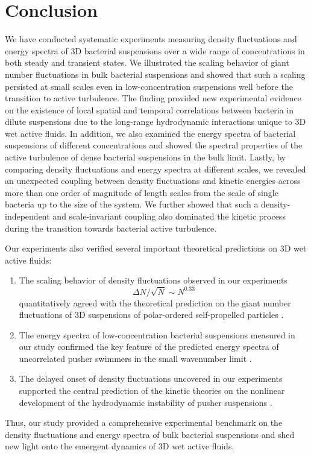 \section{Conclusion}
We have conducted systematic experiments measuring density fluctuations and energy spectra of 3D bacterial suspensions over a wide range of concentrations in both steady and transient states. We illustrated the scaling behavior of giant number fluctuations in bulk bacterial suspensions and showed that such a scaling persisted at small scales even in low-concentration suspensions well before the transition to active turbulence. The finding provided new experimental evidence on the existence of local spatial and temporal correlations between bacteria in dilute suspensions due to the long-range hydrodynamic interactions unique to 3D wet active fluids. In addition, we also examined the energy spectra of bacterial suspensions of different concentrations and showed the spectral properties of the active turbulence of dense bacterial suspensions in the bulk limit. Lastly, by comparing density fluctuations and energy spectra at different scales, we revealed an unexpected coupling between density fluctuations and kinetic energies across more than one order of magnitude of length scales from the scale of single bacteria up to the size of the system. We further showed that such a density-independent and scale-invariant coupling also dominated the kinetic process during the transition towards bacterial active turbulence.

Our experiments also verified several important theoretical predictions on 3D wet active fluids:
\begin{enumerate}
\item The scaling behavior of density fluctuations observed in our experiments
$$
\Delta N/\sqrt N \sim N^{0.33}
$$
quantitatively agreed with the theoretical prediction on the giant number fluctuations of 3D suspensions of polar-ordered self-propelled particles \cite{Simha2002}.
\item The energy spectra of low-concentration bacterial suspensions measured in our study confirmed the key feature of the predicted energy spectra of uncorrelated pusher swimmers in the small wavenumber limit \cite{Bardfalvy2019}.
\item The delayed onset of density fluctuations uncovered in our experiments supported the central prediction of the kinetic theories on the nonlinear development of the hydrodynamic instability of pusher suspensions \cite{Saintillan2008a, Saintillan2008b}.
\end{enumerate}
Thus, our study provided a comprehensive experimental benchmark on the density fluctuations and energy spectra of bulk bacterial suspensions and shed new light onto the emergent dynamics of 3D wet active fluids.
